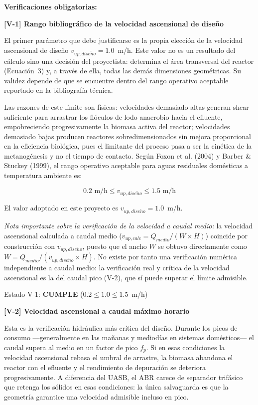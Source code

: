 \documentclass[12pt,a4paper]{article}
\begin{document}
\textbf{Verificaciones obligatorias:}

\textbf{[V-1] Rango bibliográfico de la velocidad ascensional de diseño}

El primer parámetro que debe justificarse es la propia elección de la velocidad ascensional de diseño $v_{up,dise\tilde{n}o} = 1.0$~m/h. Este valor no es un resultado del cálculo sino una decisión del proyectista: determina el área transversal del reactor (Ecuación~3) y, a través de ella, todas las demás dimensiones geométricas. Su validez depende de que se encuentre dentro del rango operativo aceptable reportado en la bibliografía técnica.

Las razones de este límite son físicas: velocidades demasiado altas generan shear suficiente para arrastrar los flóculos de lodo anaerobio hacia el efluente, empobreciendo progresivamente la biomasa activa del reactor; velocidades demasiado bajas producen reactores sobredimensionados sin mejora proporcional en la eficiencia biológica, pues el limitante del proceso pasa a ser la cinética de la metanogénesis y no el tiempo de contacto. Según Foxon et al. (2004) y Barber \& Stuckey (1999), el rango operativo aceptable para aguas residuales domésticas a temperatura ambiente es:

\begin{equation}
0.2 \text{ m/h} \leq v_{up,dise\tilde{n}o} \leq 1.5 \text{ m/h}
\end{equation}

El valor adoptado en este proyecto es $v_{up,dise\tilde{n}o} = 1.0$~m/h.

\textit{Nota importante sobre la verificación de la velocidad a caudal medio:} la velocidad ascensional calculada a caudal medio ($v_{up,calc} = Q_{medio} / (W \times H)$) coincide por construcción con $v_{up,dise\tilde{n}o}$, puesto que el ancho $W$ se obtuvo directamente como $W = Q_{medio} / (v_{up,dise\tilde{n}o} \times H)$. No existe por tanto una verificación numérica independiente a caudal medio: la verificación real y crítica de la velocidad ascensional es la del caudal pico (V-2), que sí puede superar el límite admisible.

Estado V-1: \textbf{CUMPLE} ($0.2 \leq 1.0 \leq 1.5$~m/h)

\textbf{[V-2] Velocidad ascensional a caudal máximo horario}

Esta es la verificación hidráulica más crítica del diseño. Durante los picos de consumo ---generalmente en las mañanas y mediodías en sistemas domésticos--- el caudal supera al medio en un factor de pico $f_p$. Si en esas condiciones la velocidad ascensional rebasa el umbral de arrastre, la biomasa abandona el reactor con el efluente y el rendimiento de depuración se deteriora progresivamente. A diferencia del UASB, el ABR carece de separador trifásico que retenga los sólidos en esas condiciones: la única salvaguarda es que la geometría garantice una velocidad admisible incluso en pico.
\end{document}
